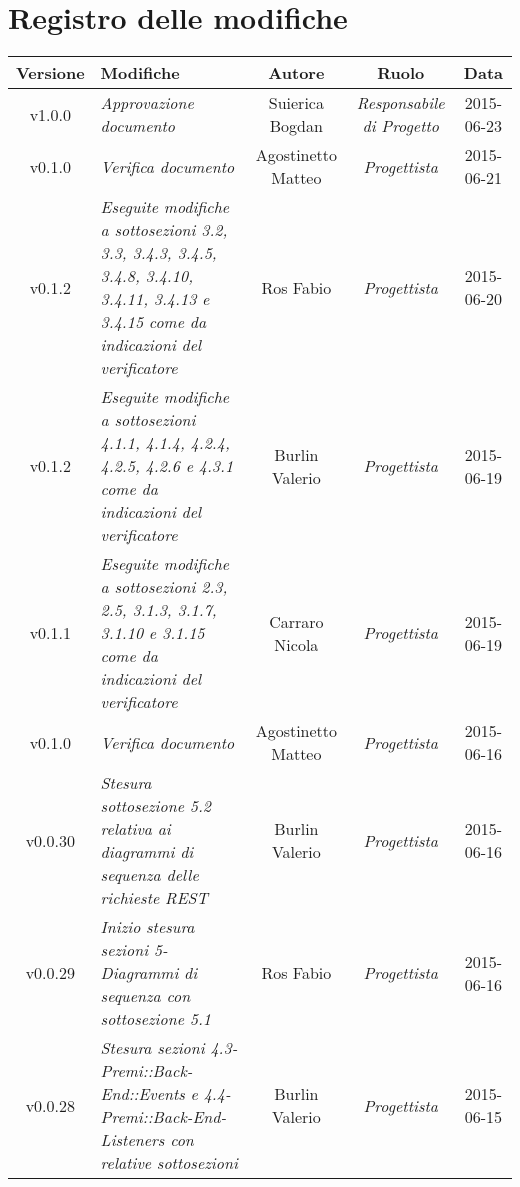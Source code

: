 \newpage
\section*{Registro delle modifiche}

\begin{table}[h]
\centering
\begin{tabular}{|c|p{}|c|c|c|}
	\toprule
		\textbf{Versione} & \textbf{Modifiche} & \textbf{Autore} & \textbf{Ruolo} & \textbf{Data}\\
	\midrule
	\midrule
		v1.0.0 & \textit{Approvazione documento} & Suierica Bogdan & \textit{Responsabile di Progetto} & 2015-06-23\\
	\midrule
		v0.1.0 & \textit{Verifica documento} & Agostinetto Matteo & \textit{Progettista} & 2015-06-21\\	
	\midrule
		v0.1.2 & \textit{Eseguite modifiche a sottosezioni 3.2, 3.3, 3.4.3, 3.4.5, 3.4.8, 3.4.10, 3.4.11, 3.4.13 e 3.4.15 come da indicazioni del verificatore} & Ros Fabio & \textit{Progettista} & 2015-06-20\\
	\midrule
		v0.1.2 & \textit{Eseguite modifiche a sottosezioni 4.1.1, 4.1.4, 4.2.4, 4.2.5, 4.2.6 e 4.3.1 come da indicazioni del verificatore} & Burlin Valerio & \textit{Progettista} & 2015-06-19\\
	\midrule
		v0.1.1 & \textit{Eseguite modifiche a sottosezioni 2.3, 2.5, 3.1.3, 3.1.7, 3.1.10 e 3.1.15 come da indicazioni del verificatore} & Carraro Nicola & \textit{Progettista} & 2015-06-19\\
	\midrule
		v0.1.0 & \textit{Verifica documento} & Agostinetto Matteo & \textit{Progettista} & 2015-06-16\\	
	\midrule
		v0.0.30 & \textit{Stesura sottosezione 5.2 relativa ai diagrammi di sequenza delle richieste REST} & Burlin Valerio & \textit{Progettista} & 2015-06-16\\
	\midrule
		v0.0.29 & \textit{Inizio stesura sezioni 5-Diagrammi di sequenza con sottosezione 5.1} & Ros Fabio & \textit{Progettista} & 2015-06-16\\
	\midrule
		v0.0.28 & \textit{Stesura sezioni 4.3-Premi::Back-End::Events e 4.4-Premi::Back-End-Listeners con relative sottosezioni } & Burlin Valerio & \textit{Progettista} & 2015-06-15\\
	\bottomrule
\end{tabular}
\end{table}

\newpage

